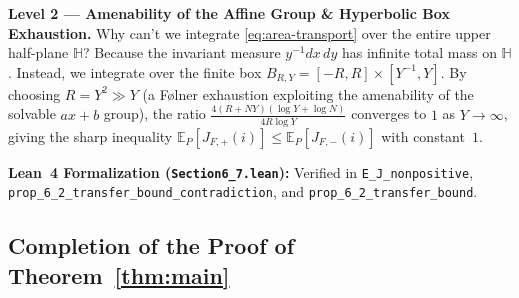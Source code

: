 \documentclass[12pt]{article}
\def\H{\mathbb{H}}
\def\E{\mathbb{E}}
\theoremstyle{definition}
\numberwithin{equation}{section}
\begin{document}
\begin{leveltwo}
\noindent\textbf{\textcolor{l2border}{Level 2 --- Amenability of the Affine Group \& Hyperbolic Box Exhaustion.}}
Why can't we integrate \eqref{eq:area-transport} over the entire upper half-plane $\H$? Because the invariant measure $y^{-1} dx\, dy$ has infinite total mass on $\H$. Instead, we integrate over the finite box $B_{R, Y} = [-R, R] \times [Y^{-1}, Y]$. By choosing $R = Y^2 \gg Y$ (a F\o lner exhaustion exploiting the amenability of the solvable $ax+b$ group), the ratio $\frac{4(R + NY)(\log Y + \log N)}{4 R \log Y}$ converges to $1$ as $Y \to \infty$, giving the sharp inequality $\E_P[J_{F, +}(i)] \le \E_P[J_{F, -}(i)]$ with constant~$1$.

\smallskip
\noindent\textbf{\textcolor{leannote}{Lean~4 Formalization (\texttt{Section6\_7.lean}):}} Verified in \texttt{E\_J\_nonpositive}, \texttt{prop\_6\_2\_transfer\_bound\_contradiction}, and \texttt{prop\_6\_2\_transfer\_bound}.
\end{leveltwo}

\subsection{Completion of the Proof of Theorem~\ref{thm:main}}
\end{document}
